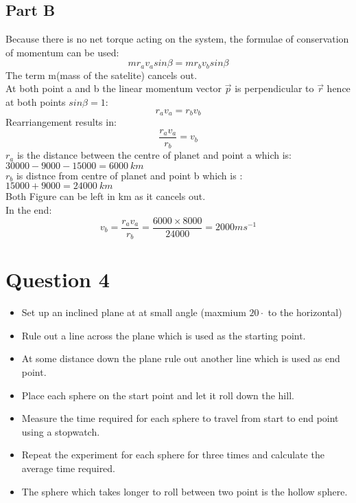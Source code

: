 \documentclass[12pt]{article}
\begin{document}
\begin{itemize}
\subsection{Part B}
Because there is no net torque acting on the system, the formulae of conservation of momentum can be used: \\
\begin{displaymath}
mr_av_asin\beta=mr_bv_bsin\beta
\end{displaymath}
The term m(mass of the satelite) cancels out. \\
At both point a and b the linear momentum vector $\vec{p}$ is perpendicular to $\vec{r}$ hence at both points $sin\beta=1$: \\
\begin{displaymath}
r_av_a=r_bv_b
\end{displaymath}
Rearriangement results in: \\
\begin{displaymath}
\frac{r_av_a}{r_b}=v_b
\end{displaymath}
$r_a$ is the distance between the centre of planet and point a which is: \\
$30000-9000-15000=6000 \ km$  \\
$r_b$ is distnce from centre of planet and point b which is : \\ $15000+9000 = 24000 \ km$ \\
Both Figure can be left in km as it cancels out. \\
In the end:
\begin{displaymath}
v_b=\frac{r_av_a}{r_b}=\frac{6000\times8000}{24000}=2000ms^{-1}
\end{displaymath}
\pagebreak
\section{Question 4}
\begin{itemize}
\item Set up an inclined plane at at small angle (maxmium $20 \cdot$ to the horizontal)
\item Rule out a line across the plane which is used as the starting point.
\item At some distance down the plane rule out another line which is used as end point.
\item Place each sphere on the start point and let it roll down the hill.
\item Measure the time required for each sphere to travel from start to end point using a stopwatch.
\item Repeat the experiment for each sphere for three times and calculate the average time required.
\item The sphere which takes longer to roll between two point is the hollow sphere.
\end{itemize}


\end{itemize}
\end{document}
